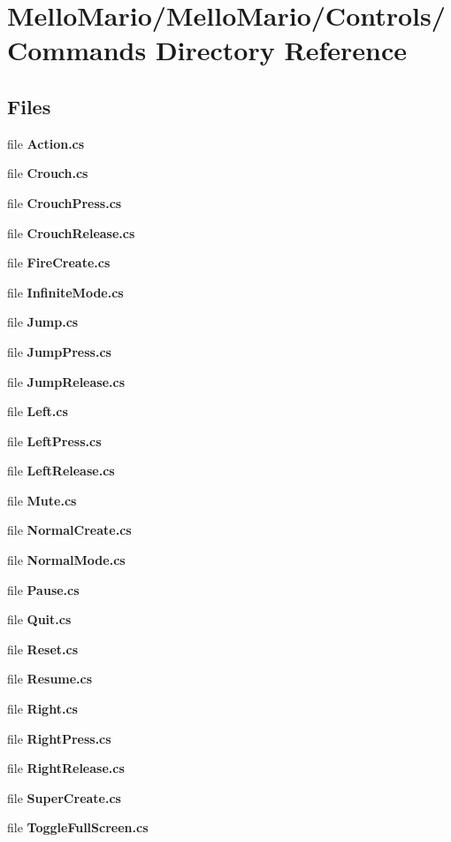 \section{Mello\+Mario/\+Mello\+Mario/\+Controls/\+Commands Directory Reference}
\label{dir_ae6cac279c21c2cd1a8c6da2d9609c1c}
\subsection*{Files}
\begin{DoxyCompactItemize}
\item 
file \textbf{ Action.\+cs}
\item 
file \textbf{ Crouch.\+cs}
\item 
file \textbf{ Crouch\+Press.\+cs}
\item 
file \textbf{ Crouch\+Release.\+cs}
\item 
file \textbf{ Fire\+Create.\+cs}
\item 
file \textbf{ Infinite\+Mode.\+cs}
\item 
file \textbf{ Jump.\+cs}
\item 
file \textbf{ Jump\+Press.\+cs}
\item 
file \textbf{ Jump\+Release.\+cs}
\item 
file \textbf{ Left.\+cs}
\item 
file \textbf{ Left\+Press.\+cs}
\item 
file \textbf{ Left\+Release.\+cs}
\item 
file \textbf{ Mute.\+cs}
\item 
file \textbf{ Normal\+Create.\+cs}
\item 
file \textbf{ Normal\+Mode.\+cs}
\item 
file \textbf{ Pause.\+cs}
\item 
file \textbf{ Quit.\+cs}
\item 
file \textbf{ Reset.\+cs}
\item 
file \textbf{ Resume.\+cs}
\item 
file \textbf{ Right.\+cs}
\item 
file \textbf{ Right\+Press.\+cs}
\item 
file \textbf{ Right\+Release.\+cs}
\item 
file \textbf{ Super\+Create.\+cs}
\item 
file \textbf{ Toggle\+Full\+Screen.\+cs}
\end{DoxyCompactItemize}
